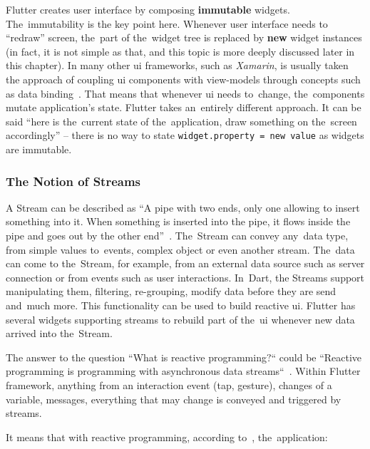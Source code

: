 Flutter creates user interface by composing \textbf{immutable} widgets. The~immutability is the key point here. Whenever user interface needs to ``redraw'' screen, the~part of the~widget tree is replaced by \textbf{new} widget instances (in fact, it is not simple as that, and this topic is more deeply discussed later in this chapter). In many other \gls{ui} frameworks, such as \textit{Xamarin}, is usually taken the approach of coupling \gls{ui} components with view-models through concepts such as data binding~\cite{xamarin-data-binding}. That means that whenever \gls{ui} needs to~change, the~components mutate application's state. Flutter takes an~entirely different approach. It can be said ``here is the~current state of the~application, draw something on the~screen accordingly'' -- there is no way to state \verb|widget.property = new value| as widgets are immutable.

\subsubsection{The Notion of Streams}
A Stream can be described as ``A pipe with two ends, only one allowing to insert something into it. When something is inserted into the pipe, it flows inside the pipe and goes out by the other end''~\cite{reactive-didier}. The~Stream can convey any~data type, from simple values to~events, complex object or even another stream. The~data can come to the~Stream, for example, from an external data source such as server connection or from events such as user interactions. In~Dart, the Streams support manipulating them, filtering, re-grouping, modify data before they are send and~much more. This functionality can be used to build reactive \gls{ui}. Flutter has several widgets supporting streams to rebuild part of the~\gls{ui} whenever new data arrived into the~Stream.

The answer to the question ``What is reactive programming$?$`` could be ``Reactive programming is programming with asynchronous data streams``~\cite{reactive-didier}\cite{reactive-red-hat}. Within Flutter framework, anything from an interaction event (tap, gesture), changes of a variable, messages, everything that may change is conveyed and triggered by streams.

It means that with reactive programming, according to~\cite{reactive-didier}, the~application:

